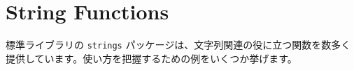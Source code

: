 \section{String Functions}

標準ライブラリの \texttt{strings} パッケージは、文字列関連の役に立つ関数を数多く提供しています。使い方を把握するための例をいくつか挙げます。




